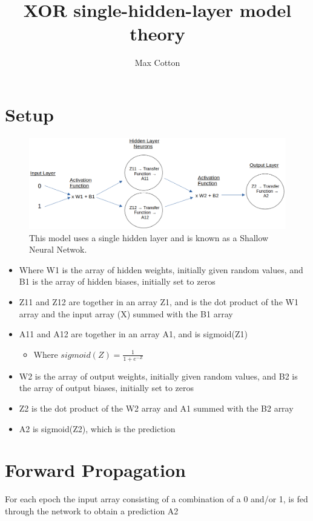 \documentclass[10pt,a4paper]{article}
\title{XOR single-hidden-layer model theory}
\author{Max Cotton}
\date{}
\begin{document}
\maketitle

\section{Setup}

\begin{figure}[h!]
\centering
\includegraphics[width=1\textwidth]{src/images/xor-ann-diagram.png}
\caption{This model uses a single hidden layer and is known as a Shallow Neural Netwok.}
\end{figure}

\begin{itemize}
    \item Where W1 is the array of hidden weights, initially given random values, and B1 is the array of hidden biases, initially set to zeros
    \item Z11 and Z12 are together in an array Z1, and is the dot product of the W1 array and the input array (X) summed with the B1 array
    \item A11 and A12 are together in an array A1, and is sigmoid(Z1)
    \begin{itemize}
        \item Where $sigmoid(Z) = \frac{1}{1+e^{-Z}}$
    \end{itemize}
    \item W2 is the array of output weights, initially given random values, and B2 is the array of output biases, initially set to zeros
    \item Z2 is the dot product of the W2 array and A1 summed with the B2 array
    \item A2 is sigmoid(Z2), which is the prediction
\end{itemize}

\section{Forward Propagation}
For each epoch the input array consisting of a combination of a 0 and/or 1, is fed through the network to obtain a prediction A2
\end{document}
